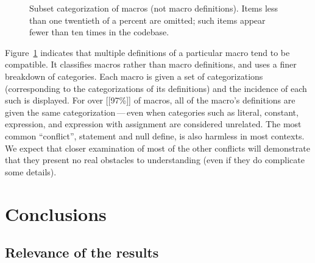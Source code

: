 \documentclass[11pt]{article}
\begin{document}




\begin{figure}
{\small\centerline{}}
\caption{Subset categorization of macros (not macro definitions).   Items
  less than one twentieth of a percent are omitted; such items appear
  fewer than ten times in the codebase.}
\label{fig:subset-categories}
\end{figure}
 
Figure~\ref{fig:subset-categories} indicates that multiple definitions of a
particular macro tend to be compatible.  It classifies macros rather than
macro definitions, and uses a finer breakdown of categories.  Each macro is
given a set of categorizations (corresponding to the categorizations of its
definitions) and the incidence of each such is displayed.  For over [[97\%]] of
macros, all of the macro's definitions are given the same
categorization\,---\,even when categories such as literal, constant,
expression, and expression with assignment are considered unrelated.  The
most common ``conflict'', statement and null define, is also harmless in
most contexts.  We expect that closer examination of most of the other
conflicts will demonstrate that they present no real obstacles to
understanding (even if they do complicate some details).


\section{Conclusions}
\label{sec:conclusion}

\subsection{Relevance of the results}
\end{document}
